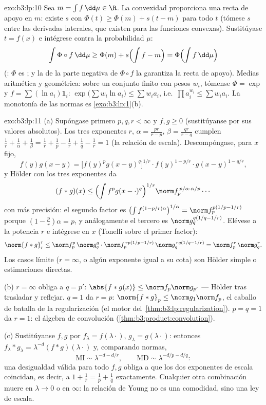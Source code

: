 \begin{solution}{exo:b3:lp:10}
Sea $m = \int f\,\dd\mu \in \R$. La convexidad proporciona una recta de
apoyo en $m$: existe $s$ con $\Phi(t) \geq \Phi(m) + s(t -
m)$ para todo $t$ (tómese $s$ entre las derivadas laterales, que existen
para las funciones convexas). Sustitúyase $t = f(x)$ e intégrese contra
la probabilidad $\mu$:
\[
\int\Phi\circ f\,\dd\mu \geq \Phi(m) + s\Bigl(\int f - m\Bigr)
= \Phi\Bigl(\int f\,\dd\mu\Bigr)
\]
(: $\Phi$ es
; y la
 de la parte negativa de
$\Phi\circ f$ la garantiza la recta de apoyo). Medias aritmética y
geométrica: sobre un conjunto finito con pesos $w_i$, tómense
$\Phi = \exp$ y $f = \sum(\ln a_i)\mathbf 1_i$:
$\exp\bigl(\sum w_i\ln a_i\bigr) \leq \sum w_ia_i$, i.e.\
$\prod a_i^{w_i} \leq \sum w_ia_i$. La monotonía de las normas es
\cref{exo:b3:lp:1}(b).
\end{solution}

\begin{solution}{exo:b3:lp:11}
(a) Supóngase primero $p, q, r < \infty$ y $f, g \geq 0$ (sustitúyanse
por sus valores absolutos). Los tres exponentes $r$,
$\alpha = \frac{pr}{r-p}$, $\beta = \frac{qr}{r-q}$
cumplen $\frac1r + \frac1\alpha + \frac1\beta = \frac1r +
\frac1p - \frac1r + \frac1q - \frac1r = 1$ (la relación de escala).
Descompóngase, para $x$ fijo,
\[
f(y)g(x-y) = \bigl[f(y)^pg(x-y)^q\bigr]^{1/r}\cdot
f(y)^{1 - p/r}\cdot g(x-y)^{1 - q/r},
\]
y Hölder con los tres exponentes da
\[
(f*g)(x) \leq \Bigl(\int f^pg(x-\cdot)^q\Bigr)^{1/r}
\norm f_p^{\,p/\alpha\cdot\alpha/p}\cdots
\]
con más precisión: el segundo factor es
$\bigl(\int f^{(1-p/r)\alpha}\bigr)^{1/\alpha} =
\norm f_p^{p(1/p - 1/r)}$ porque $(1 - \frac pr)\alpha = p$, y
análogamente el tercero es $\norm g_q^{q(1/q - 1/r)}$. Elévese a la
potencia $r$ e intégrese en $x$ (Tonelli sobre el primer factor):
\[
\norm{f*g}_r^r \leq \norm f_p^p\,\norm g_q^q\cdot
\norm f_p^{\,rp(1/p - 1/r)}\,\norm g_q^{\,rq(1/q - 1/r)}
= \norm f_p^r\,\norm g_q^r .
\]
Los casos límite ($r = \infty$, o algún exponente igual a su cota) son
Hölder simple o estimaciones directas.

(b) $r = \infty$ obliga a $q = p'$: $\abs{f*g(x)} \leq \norm
f_p\norm g_{p'}$ --- Hölder tras trasladar y reflejar. $q = 1$ da
$r = p$: $\norm{f*g}_p \leq \norm
g_1\norm f_p$, el caballo de batalla de la regularización (el motor
del~\cref{thm:b3:lp:regularization}). $p = q = 1$ da $r = 1$: el álgebra
de convolución
(\cref{thm:b3:product:convolution}).

(c) Sustitúyanse $f, g$ por $f_\lambda = f(\lambda\cdot)$,
$g_\lambda = g(\lambda\cdot)$: entonces $f_\lambda*g_\lambda =
\lambda^{-d}(f*g)(\lambda\cdot)$ y, comparando normas,
\[
\text{MI} \sim \lambda^{-d - d/r}, \qquad
\text{MD} \sim \lambda^{-d/p - d/q} :
\]
una desigualdad válida para todo $f, g$ obliga a que los dos exponentes
de escala coincidan, es decir, a $1 + \frac1r = \frac1p + \frac1q$
exactamente. Cualquier otra combinación muere en $\lambda \to 0$ o en
$\infty$: la relación de Young no es una comodidad, sino una ley de
escala.
\end{solution}

